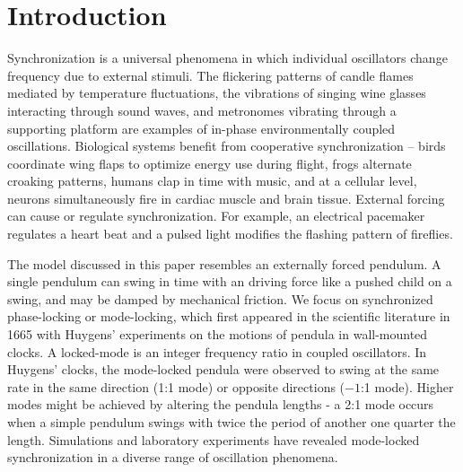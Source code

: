 \documentclass[preprint,showpacs,preprintnumbers,amsmath,amssymb,aps,prb]{revtex4-1}
\theoremstyle{remark}
\begin{document}
\section{Introduction} 
Synchronization is a universal phenomena
in which
individual oscillators change frequency due
to external stimuli.\cite{Pikovsky2003}
The
flickering patterns of
candle flames 
mediated by temperature fluctuations,\cite{Okamoto2016}
the vibrations of singing wine glasses interacting 
through sound waves,\cite{Arane2009}
and metronomes vibrating through a supporting platform\cite{Jia2015}
are examples of in-phase environmentally coupled oscillations. 
Biological systems benefit from cooperative
synchronization --
birds  coordinate wing flaps
to optimize energy use during flight,\cite{Portugal2014}
frogs alternate croaking patterns,\cite{Aihara2014}
humans clap in time with music,\cite{Tranchant2016}
and 
at a cellular level, 
neurons simultaneously fire in cardiac muscle\cite{MartinHall1999}
and brain tissue.\cite{Singer1999}
%
External forcing
can cause or regulate synchronization.
For example, 
an electrical pacemaker 
regulates a heart beat and
a pulsed light modifies the
flashing pattern of fireflies.

The model discussed in this paper
resembles an externally forced pendulum.
A single pendulum 
can swing in time with an %
driving force
like  %
a pushed child on a swing,
and may be damped
by mechanical friction.
We focus on 
synchronized phase-locking or mode-locking,
which 
first appeared in the scientific literature
in 1665 with 
Huygens'  experiments on the
motions of %
pendula in wall-mounted clocks.\cite{Bennett2002}
A locked-mode is an integer frequency ratio
in coupled oscillators. %
In Huygens' clocks,
the mode-locked pendula were observed to swing at the same rate
in the same direction (1:1 mode) or
opposite directions ($-1$:1 mode).
Higher modes might be achieved
by altering the pendula lengths - 
a 2:1 mode occurs when a simple pendulum
swings with twice the period
of another one quarter the length.
Simulations and laboratory experiments
have revealed 
mode-locked synchronization
in a diverse range of 
oscillation phenomena.
\end{document}
